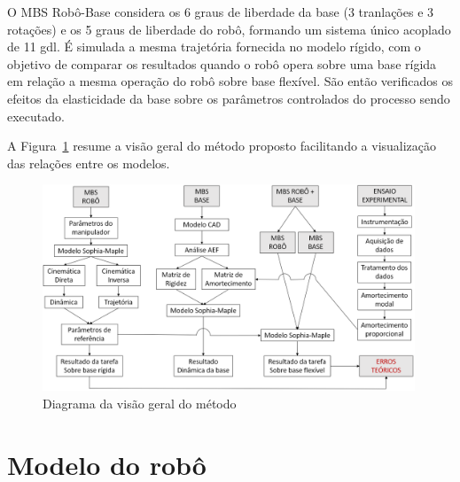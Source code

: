 O MBS Robô-Base considera os 6 graus de liberdade da base (3 tranlações e 3
rotações) e os 5 graus de liberdade do robô, formando um sistema único acoplado
de 11 gdl. É simulada a mesma trajetória fornecida no modelo rígido, com o
objetivo de comparar os resultados quando o robô opera sobre uma base rígida em
relação a mesma operação do robô sobre base flexível. São então verificados os
efeitos da elasticidade da base sobre os parâmetros controlados do processo
sendo executado.

A Figura~\ref{fig::visgeral} resume a visão geral
do método proposto facilitando a visualização das relações entre os modelos.

\begin{figure}[h]
	\centering 
 	\includegraphics[width=0.99\textwidth]{figs/visgeral}
 	\caption{Diagrama da visão geral do método}
 	\label{fig::visgeral}
\end{figure}



\section{Modelo do robô} \label{sec::robo}


